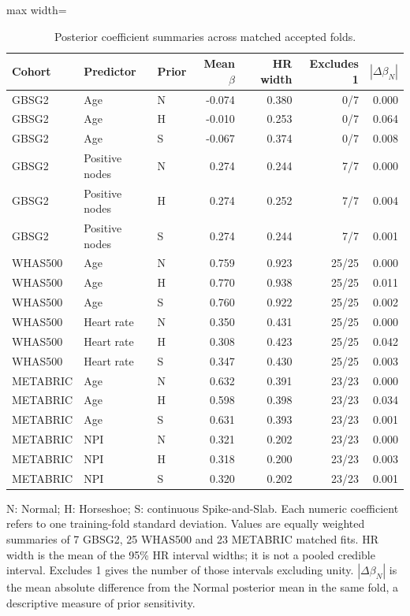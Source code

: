 \begin{table}[htbp]
\centering
\begingroup\singlespacing\footnotesize
\setlength{\tabcolsep}{3pt}
\caption{Posterior coefficient summaries across matched accepted folds.}\label{tab:exam-posterior-summary}
\begin{adjustbox}{max width=\textwidth}
\begin{tabular}{@{}lllrrrr@{}}
\toprule Cohort & Predictor & Prior & Mean $\beta$ & HR width & Excludes 1 & $|\Delta\beta_N|$\\\midrule
GBSG2 & Age & N & -0.074 & 0.380 & 0/7 & 0.000\\
GBSG2 & Age & H & -0.010 & 0.253 & 0/7 & 0.064\\
GBSG2 & Age & S & -0.067 & 0.374 & 0/7 & 0.008\\
GBSG2 & Positive nodes & N & 0.274 & 0.244 & 7/7 & 0.000\\
GBSG2 & Positive nodes & H & 0.274 & 0.252 & 7/7 & 0.004\\
GBSG2 & Positive nodes & S & 0.274 & 0.244 & 7/7 & 0.001\\
WHAS500 & Age & N & 0.759 & 0.923 & 25/25 & 0.000\\
WHAS500 & Age & H & 0.770 & 0.938 & 25/25 & 0.011\\
WHAS500 & Age & S & 0.760 & 0.922 & 25/25 & 0.002\\
WHAS500 & Heart rate & N & 0.350 & 0.431 & 25/25 & 0.000\\
WHAS500 & Heart rate & H & 0.308 & 0.423 & 25/25 & 0.042\\
WHAS500 & Heart rate & S & 0.347 & 0.430 & 25/25 & 0.003\\
METABRIC & Age & N & 0.632 & 0.391 & 23/23 & 0.000\\
METABRIC & Age & H & 0.598 & 0.398 & 23/23 & 0.034\\
METABRIC & Age & S & 0.631 & 0.393 & 23/23 & 0.001\\
METABRIC & NPI & N & 0.321 & 0.202 & 23/23 & 0.000\\
METABRIC & NPI & H & 0.318 & 0.200 & 23/23 & 0.003\\
METABRIC & NPI & S & 0.320 & 0.202 & 23/23 & 0.001\\
\bottomrule
\end{tabular}
\end{adjustbox}
\par\smallskip
\begin{minipage}{\textwidth}
N: Normal; H: Horseshoe; S: continuous Spike-and-Slab. Each numeric coefficient refers to one training-fold standard deviation. Values are equally weighted summaries of 7 GBSG2, 25 WHAS500 and 23 METABRIC matched fits. HR width is the mean of the 95\% HR interval widths; it is not a pooled credible interval. Excludes 1 gives the number of those intervals excluding unity. $|\Delta\beta_N|$ is the mean absolute difference from the Normal posterior mean in the same fold, a descriptive measure of prior sensitivity.
\end{minipage}
\endgroup
\end{table}
